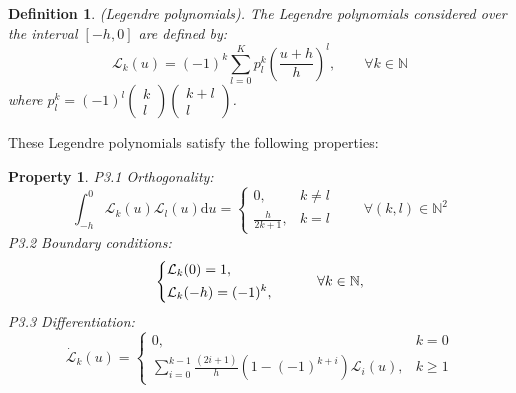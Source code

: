 \documentclass[a4paper]{cas-sc}
\newtheorem{defi}[theorem]{Definition}
\newtheorem{property}[theorem]{Property}
\begin{document}
\begin{defi}
  (Legendre polynomials). The Legendre polynomials considered over the interval $[ - h,0]$ are defined by:
  \begin{equation}
    {\mathcal{L}_k}(u) = {( - 1)^k}\sum\limits_{l = 0}^K {p_l^k} {\left( {\frac{{u + h}}{h}} \right)^l},\quad \quad \forall k \in \mathbb{N}
  \end{equation}
  where $p_l^k = {( - 1)^l}\left( {\begin{array}{*{20}{l}}
        k \\
        l
      \end{array}} \right)\left( {\begin{array}{*{20}{c}}
        {k + l} \\
        l
      \end{array}} \right)$.
\end{defi}

These Legendre polynomials satisfy the following properties:
\begin{property}

  \textit{P3.1} Orthogonality:
  \begin{equation}
    \int_{ - h}^0 {{\mathcal{L}_k}} (u){\mathcal{L}_l}(u){\text{d}}u = \left\{ {\begin{array}{*{20}{l}}
          {0,}                  & {k \ne l} \\
          {\frac{h}{{2k + 1}},} & {k = l}
        \end{array}} \right.\quad \quad \forall (k,l) \in {\mathbb{N}^2}
    \label{p3.1}
  \end{equation}
  \textit{P3.2} Boundary conditions:
  \begin{equation}
    \left\{ \begin{gathered}
      {\mathcal{L}_k}(0) = 1, \hfill \\
      {\mathcal{L}_k}( - h) = {( - 1)^k}, \hfill \\
    \end{gathered}  \right.\quad \quad \quad \forall k \in \mathbb{N},
    \label{p3.2}
  \end{equation}
  \textit{P3.3} Differentiation:
  \begin{equation}
    \dot{\mathcal{L}}_{k}(u)= \begin{cases}0, & k=0 \\ \sum_{i=0}^{k-1} \frac{(2 i+1)}{h}\left(1-(-1)^{k+i}\right) \mathcal{L}_{i}(u), & k \geq 1\end{cases}
    \label{p3.3}
  \end{equation}
\end{property}
\end{document}

